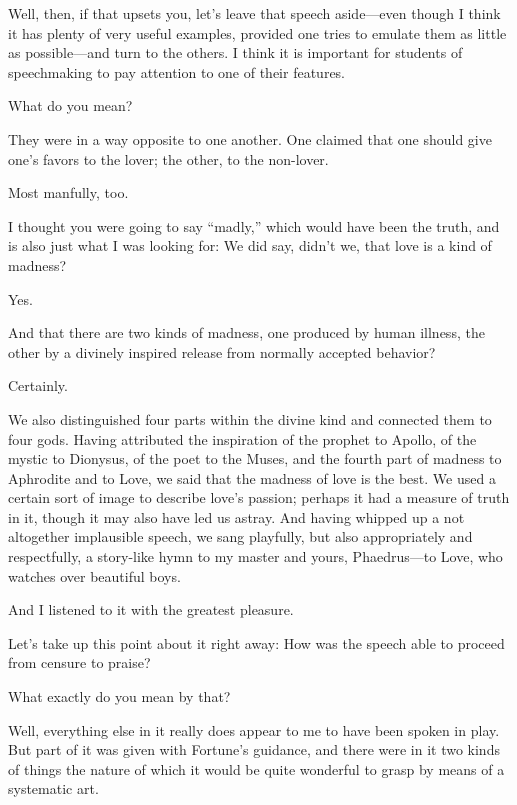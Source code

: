 \saysocrates Well, then, if that upsets you, let’s leave that speech
aside---even though I think it has plenty of very useful examples,
provided one tries to emulate them as little as possible---and turn to
the others. I think it is important for students of speechmaking to pay
attention to one of their features.

\sayphaedrus What do you mean?

\saysocrates They were in a way opposite to one another. One claimed that
one should give one’s favors to the lover; the other, to the non-lover.

\sayphaedrus Most manfully, too.

\saysocrates I thought you were going to say “madly,” which would have been
the truth, and is also just what I was looking for: We did say, didn’t
we, that love is a kind of madness?

\sayphaedrus Yes.

\saysocrates And that there are two kinds of madness, one produced by human
illness, the other by a divinely inspired release from normally accepted
behavior?

\sayphaedrus Certainly.

\saysocrates We also distinguished four parts within the divine kind and
connected them to four gods. Having attributed the inspiration of the
prophet to Apollo, of the mystic to Dionysus, of the poet to the Muses,
and the fourth part of madness to Aphrodite and to Love, we said that
the madness of love is the best. We used a certain sort of image to
describe love’s passion; perhaps it had a measure of truth in it, though
it may also have led us astray. And having whipped up a not altogether
implausible speech, we sang playfully, but also appropriately
and respectfully, a story-like hymn to my master and yours,
Phaedrus---to Love, who watches over beautiful boys.

\sayphaedrus And I listened to it with the greatest pleasure.

\saysocrates Let’s take up this point about it right away: How was the
speech able to proceed from censure to praise?

\sayphaedrus What exactly do you mean by that?

\saysocrates Well, everything else in it really does appear to me to have
been spoken in play. But part of it was given with Fortune’s guidance, 
and there were in it two kinds of things the nature of which it
would be quite wonderful to grasp by means of a systematic art.

